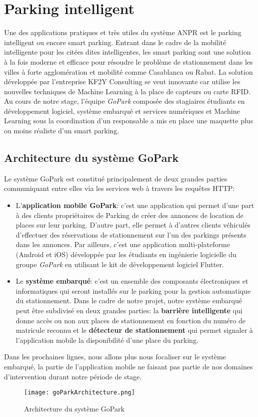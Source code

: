 \section{Parking intelligent}
Une des applications pratiques et très utiles du système ANPR est le parking intelligent ou encore smart parking. Entrant dans le cadre de la mobilité intelligente pour les citées dites intelligentes, les smart parking sont  une solution à la fois moderne et efficace pour résoudre le problème de stationnement dans les villes à forte agglomération et mobilité comme Casablanca ou Rabat. La solution développée par l’entreprise KF2Y Consulting se veut innovante car utilise les nouvelles techniques de Machine Learning à la place de capteurs ou carte RFID. Au cours de notre stage, l'équipe \textit{GoPark} composée des stagiaires étudiants en développement logiciel, système embarqué et services numériques et Machine Learning sous la coordination d’un responsable a mis en place une maquette plus ou moins réaliste d’un smart parking. 

    \subsection{Architecture du système GoPark}
Le système GoPark est constitué principalement de deux grandes parties communiquant entre elles via les services web à travers les requêtes HTTP: 
    \begin{itemize}
        \item L’\textbf{application mobile GoPark}: c’est une application qui permet d’une part à des clients propriétaires de Parking de créer des annonces de location de places sur leur parking. D’autre part, elle permet à d’autres clients véhiculés d’effectuer des réservations de stationnement sur l’un des parkings présents dans les annonces. Par ailleurs, c'est une application multi-plateforme (Android et iOS) développée par les étudiants en ingénierie logicielle du groupe \textit{GoPark} en utilisant le kit de développement logiciel Flutter.
        \item Le \textbf{système embarqué}: c’est un ensemble des composants électroniques et informatiques qui seront installés sur le parking pour la gestion automatique du stationnement. Dans le cadre de notre projet, notre système embarqué peut être subdivisé en deux grandes parties: la \textbf{barrière intelligente} qui donne accès ou non aux places de stationnement en fonction du numéro de matricule reconnu et le \textbf{détecteur de stationnement} qui permet signaler à l'application mobile la disponibilité d'une place du parking.
    \end{itemize}
    Dans les prochaines lignes, nous allons plus nous focaliser sur le système embarqué, la partie de l'application mobile ne faisant pas partie de nos domaines d'intervention durant notre période de stage. 
    \begin{figure}
        \centering
        \texttt{[image: goParkArchitecture.png]}
        \caption{Architecture du système GoPark}
    \end{figure}

